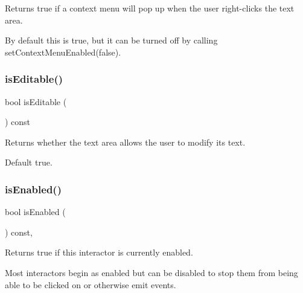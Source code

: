 Returns true if a context menu will pop up when the user right-\/clicks the text area. 

By default this is true, but it can be turned off by calling set\+Context\+Menu\+Enabled(false). \mbox{\label{classsgl_1_1GTextArea_a012b5afb54e037e6c5498cf0932a521b}} 
\subsubsection{\texorpdfstring{is\+Editable()}{isEditable()}}
{\footnotesize\ttfamily bool is\+Editable (\begin{DoxyParamCaption}{ }\end{DoxyParamCaption}) const\hspace{0.3cm}{\ttfamily [virtual]}}



Returns whether the text area allows the user to modify its text. 

Default true. \mbox{\label{classsgl_1_1GInteractor_aacb819fb241851fd9fc045271baa4034}} 
\subsubsection{\texorpdfstring{is\+Enabled()}{isEnabled()}}
{\footnotesize\ttfamily bool is\+Enabled (\begin{DoxyParamCaption}{ }\end{DoxyParamCaption}) const\hspace{0.3cm}{\ttfamily [virtual]}, {\ttfamily [inherited]}}



Returns true if this interactor is currently enabled. 

Most interactors begin as enabled but can be disabled to stop them from being able to be clicked on or otherwise emit events. \mbox{\label{classsgl_1_1GTextArea_ae09e72290b6e8a23bcc77752da6dffa5}} 
